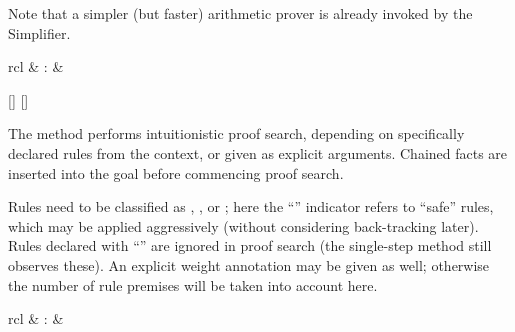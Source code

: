 \begin{isabellebody}
\begin{isamarkuptext}
  Note that a simpler (but faster) arithmetic prover is
  already invoked by the Simplifier.%
\end{isamarkuptext}%
\isamarkuptrue%
%
\isamarkuptrue%
%
\begin{isamarkuptext}%
\begin{matharray}{rcl}
    \hypertarget{method.HOL.iprover}{\hyperlink{method.HOL.iprover}{\mbox{}}} & : &  \\
  \end{matharray}

  \begin{railoutput}
[]
\rail@plus
{}
[]
\rail@endplus
\rail@end
\end{railoutput}


  The \hyperlink{method.HOL.iprover}{\mbox{}} method performs intuitionistic proof
  search, depending on specifically declared rules from the context,
  or given as explicit arguments.  Chained facts are inserted into the
  goal before commencing proof search.

  Rules need to be classified as \hyperlink{attribute.Pure.intro}{\mbox{}},
  \hyperlink{attribute.Pure.elim}{\mbox{}}, or \hyperlink{attribute.Pure.dest}{\mbox{}}; here the
  ``'' indicator refers to ``safe'' rules, which may be
  applied aggressively (without considering back-tracking later).
  Rules declared with ``'' are ignored in proof search (the
  single-step \hyperlink{method.Pure.rule}{\mbox{}} method still observes these).  An
  explicit weight annotation may be given as well; otherwise the
  number of rule premises will be taken into account here.%
\end{isamarkuptext}%
\isamarkuptrue%
%
\isamarkuptrue%
%
\begin{isamarkuptext}%
\begin{matharray}{rcl}
    \hypertarget{method.HOL.coherent}{\hyperlink{method.HOL.coherent}{\mbox{}}} & : &  \\
  \end{matharray}


\end{isamarkuptext}
\end{isabellebody}
